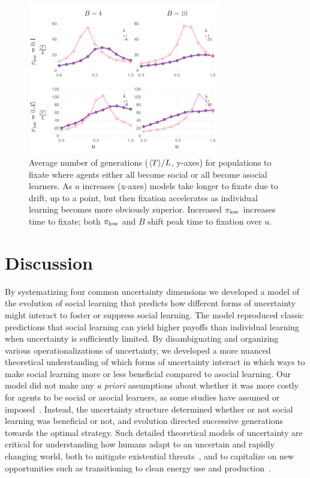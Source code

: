 \documentclass[letterpaper,11.5pt]{scrartcl}
\begin{document}
\begin{figure}
  \caption{Average number of generations ($\langle T \rangle/L$, y-axes) for populations to fixate
  where agents either all become social or all become asocial learners. As
  $u$ increases (x-axes) models take longer to fixate due to drift, up to a point,
but then fixation accelerates as individual learning becomes more obviously 
superior. Increased $\pi_{\mathrm{low}}$ increases time to fixate; both $\pi_{\mathrm{low}}$ and $B$
shift peak time to fixation over $u$.} 
  \label{fig:steps}
\centering
    \includegraphics[width=0.75\textwidth]{Figures/stepResultsPlots.pdf}
\end{figure}

\section{Discussion}

By systematizing four common uncertainty dimensions we developed a model of
the evolution of social learning that
predicts how different forms of uncertainty might interact to foster or suppress
social learning.  The model reproduced classic predictions that social learning can
yield higher payoffs than individual learning when uncertainty is sufficiently
limited.  By disambiguating and organizing various operationalizations of
uncertainty, we developed a more nuanced theoretical understanding of which forms
of uncertainty interact in which ways to make social learning more or less
beneficial compared to asocial learning.
Our model did not make any \emph{a priori} assumptions about whether it was
more costly for agents to be social or asocial learners, as some studies have
assumed or imposed~\cite{Rogers1988,Feldman1996,Morgan2012}. 
Instead, the uncertainty structure determined whether
or not social learning was beneficial or not, and evolution directed successive
generations towards the optimal strategy.
Such detailed theoretical models of uncertainty
are critical for understanding how humans adapt to an uncertain and
rapidly changing world, both to mitigate existential
threats~\cite{Moya2020,Jones2021}, and to capitalize on new opportunities such as
transitioning to clean energy use and
production~\cite{NatureEnergyEditorialPromisesPremises2018,Brisbois2022}.
\end{document}
